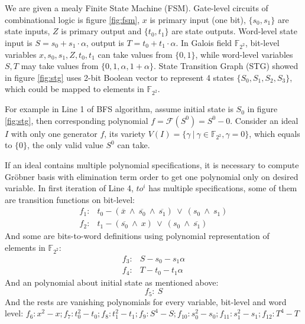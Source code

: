 \begin{Example}
\label{ex:2bit}

We are given a mealy Finite State Machine (FSM). Gate-level circuits of combinational logic
is figure \ref{fig:fsm}, $x$ is primary input (one bit),
$\{s_0, s_1\}$ are state inputs, $Z$ is primary output and $\{t_0, t_1\}$ are state outputs.
Word-level state input is $S = s_0 + s_1\cdot\alpha$, output is $T = t_0 + t_1\cdot\alpha$. In Galois field
$\mathbb{F}_{2^2}$, bit-level variables $x, s_0, s_1, Z, t_0, t_1$ can take values from $\{0, 1\}$, while
word-level variables $S, T$ may take values from $\{0, 1, \alpha, 1 + \alpha\}$. State Transition Graph (STG)
showed in figure \ref{fig:stg} uses 2-bit Boolean vector to represent 4 states $\{S_0, S_1, S_2, S_3\}$, which
could be mapped to elements in $\mathbb{F}_{2^2}$.

For example in Line 1 of BFS algorithm, assume initial state is $S_0$ in figure \ref{fig:stg}, then corresponding
polynomial $f = \mathcal{F}(S^0) = S^0 - 0$. Consider an ideal $I$ with only one generator $f$, its variety
$V(I) = \{\gamma\ |\ \gamma \in \mathbb{F}_{2^2}, \gamma = 0\}$, which equals to $\{0\}$, the only
valid value $S^0$ can take.

If an ideal contains multiple polynomial specifications, it is necessary to compute Gr\"obner basis with elimination term
order to get one polynomial only on desired variable. In first iteration of Line 4, $to^i$ has multiple specifications,
some of them are transition functions on bit-level:
\begin{displaymath}
\begin{array}{ll}
f_1:& t_0 - (\overline{x}\ \land\ \overline{s_0}\ \land\ \overline{s_1})\ \lor\ (s_0\ \land\ s_1) \\
f_2:& t_1 - (\overline{s_0}\ \land\ x)\ \lor\ (s_0\ \land\ \overline{s_1})\
\end{array}
\end{displaymath}
And some are bits-to-word definitions using polynomial representation of elements in $\mathbb{F}_{2^2}$:
\begin{displaymath}
\begin{array}{ll}
f_3:& S - s_0 - s_1\alpha \\
f_4:& T - t_0 - t_1\alpha
\end{array}
\end{displaymath}
And an polynomial about initial state as mentioned above:
\begin{displaymath}
f_5:\  S
\end{displaymath}
And the rests are vanishing polynomials for every variable, bit-level and word level:
$f_6: x^2 - x; f_7: t_0^2 - t_0; f_8: t_1^2 - t_1; f_9: S^4 - S; f_{10}: s_0^2 - s_0;
f_{11}: s_1^2 - s_1; f_{12}: T^4 - T$


\end{Example}
